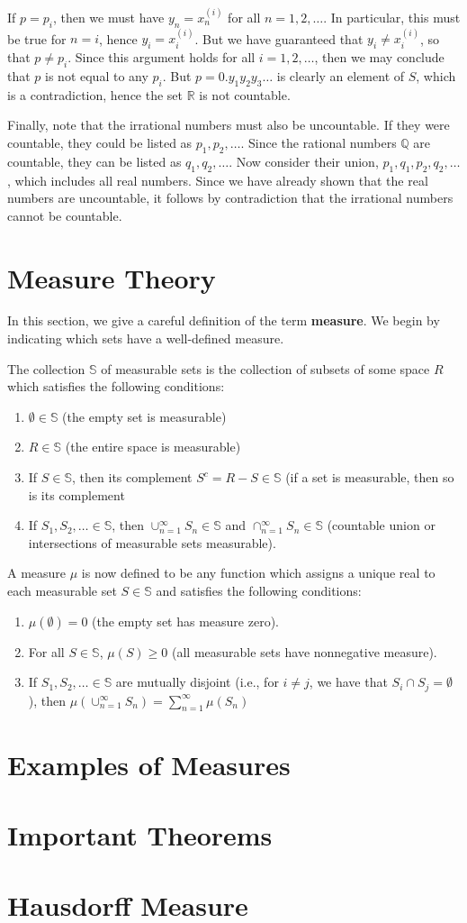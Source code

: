 If $p = p_i$, then we must have $y_n = x_n^{\left(i\right)}$ for all
$n = 1, 2, \dots$.  In particular, this must be true for $n = i$,
hence $y_i = x_i^{\left(i\right)}$.  But we have guaranteed that
$y_i \neq x_i^{\left(i\right)}$, so that $p \neq p_i$.  Since this
argument holds for all $i = 1, 2, \dots$, then we may conclude that
$p$ is not equal to any $p_i$.  But $p = 0.y_1y_2y_3\dots$ is clearly
an element of $S$, which is a contradiction, hence the set
$\mathbb{R}$ is not countable.

Finally, note that the irrational numbers must also be uncountable.
If they were countable, they could be listed as $p_1, p_2, \dots$.
Since the rational numbers $\mathbb{Q}$ are countable, they can be
listed as $q_1, q_2, \dots$.  Now consider their union,
$p_1, q_1, p_2, q_2, \dots$, which includes all real numbers.  Since
we have already shown that the real numbers are uncountable, it
follows by contradiction that the irrational numbers cannot be
countable.

\section{Measure Theory}
%
In this section, we give a careful definition of the term
\textbf{measure}.  We begin by indicating which sets have a
well-defined measure.

The collection $\mathbb{S}$ of measurable sets is the collection of
subsets of some space $R$ which satisfies the following conditions:
\begin{enumerate}
\item $\emptyset \in \mathbb{S}$ (the empty set is measurable)
\item $R \in \mathbb{S}$  (the entire space is measurable)
\item If $S \in \mathbb{S}$, then its complement
  $S^c = R - S \in \mathbb{S}$ (if a set is measurable, then so is its
  complement
\item If $S_1, S_2, \dots \in \mathbb{S}$, then
  $\cup_{n=1}^\infty S_n \in \mathbb{S}$ and
  $\cap_{n=1}^\infty S_n \in \mathbb{S}$ (countable union or
  intersections of measurable sets measurable).
\end{enumerate}

A measure $\mu$ is now defined to be any function which assigns a
unique real to each measurable set $S \in \mathbb{S}$ and satisfies
the following conditions:
\begin{enumerate}
\item $\mu(\emptyset) = 0$ (the empty set has measure zero).
\item For all $S \in \mathbb{S}$, $\mu(S) \geq 0$ (all measurable sets
  have nonnegative measure).
\item If $S_1, S_2, \dots \in \mathbb{S}$ are mutually disjoint (i.e., for
  $i \neq j$, we have that $S_i \cap S_j = \emptyset$), then
  $\mu\left(\cup_{n=1}^\infty S_n\right) = \sum_{n=1}^\infty \mu(S_n)$
\end{enumerate}
\section{Examples of Measures}
%
\section{Important Theorems}
%
\section{Hausdorff Measure}


